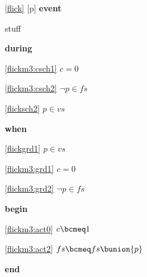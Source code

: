 \noindent \ref{flick} [p] \textbf{event}
  \item   \begin{block}
    \item   stuff
  \end{block}
\begin{block}
  \item   \textbf{during}
  \begin{block}
  \item[ \eqref{flickm3:csch1} ]{$c = 0 $} %
  \item[ \eqref{flickm3:csch2} ]{$\neg p \in fs $} %
  \item[ \eqref{flicksch2} ]{$p \in vs$} %
  \end{block}
  \item   \textbf{when}
  \begin{block}
  \item[ \eqref{flickgrd1} ]{$p \in vs$} %
  \item[ \eqref{flickm3:grd1} ]{$c = 0 $} %
  \item[ \eqref{flickm3:grd2} ]{$\neg p \in fs $} %
  \end{block}
  \item   \textbf{begin}
  \begin{block}
  \item[ \eqref{flickm3:act0} ]{$c \bcmeq 1$} %
  \item[ \eqref{flickm3:act2} ]{$fs \bcmeq fs \bunion \{ p \} $} %
  \end{block}
  \item   \textbf{end} \\
\end{block}
